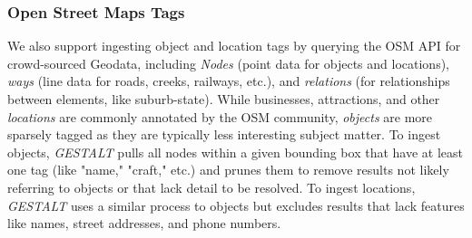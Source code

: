\subsubsection{Open Street Maps Tags}
We also support ingesting object and location tags by querying the OSM API
for crowd-sourced Geodata, including \textit{Nodes} (point data for objects and locations), \textit{ways} (line data for roads, creeks, railways, etc.), and \textit{relations} (for relationships between elements, like suburb-state).
While businesses, attractions, and other \textit{locations} are commonly annotated by the OSM community, \textit{objects} are more sparsely tagged as they are typically less interesting subject matter. 
To ingest objects, \emph{GESTALT} pulls all nodes within a given bounding box that have at least one tag (like "name," "craft," etc.) and prunes them to remove results not likely referring to objects or that lack detail to be resolved.
To ingest locations, \emph{GESTALT} uses a similar process to objects but excludes results that lack features like names, street addresses, and phone numbers. 
 

